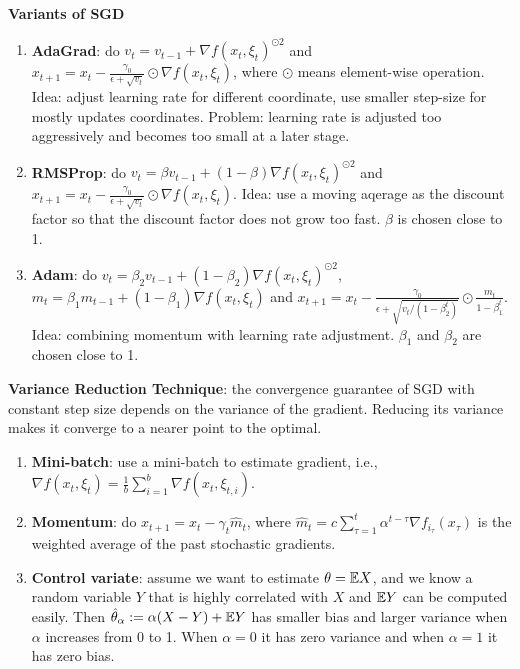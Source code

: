 \begin{enumerate}
\end{enumerate}

\textbf{Variants of SGD}
\begin{enumerate}
    \item \textbf{AdaGrad}: do $v_t = v_{t-1} + \nabla f(x_t, \xi_t)^{\odot 2}$ and $x_{t+1} = x_t - \frac{\gamma_0}{\epsilon+\sqrt{v_t}} \odot \nabla f(x_t, \xi_t)$, where $\odot$ means element-wise operation. Idea: adjust learning rate for different coordinate, use smaller step-size for mostly updates coordinates. Problem: learning rate is adjusted too aggressively and becomes too small at a later stage.
    \item \textbf{RMSProp}: do $v_t = \beta v_{t-1} + (1-\beta)\nabla f(x_t, \xi_t)^{\odot 2}$ and $x_{t+1} = x_t - \frac{\gamma_0}{\epsilon+\sqrt{v_t}} \odot \nabla f(x_t, \xi_t)$. Idea: use a moving aqerage as the discount factor so that the discount factor does not grow too fast. $\beta$ is chosen close to 1.
    \item \textbf{Adam}: do $v_t = \beta_2 v_{t-1}+(1-\beta_2)\nabla f(x_t, \xi_t)^{\odot 2}$, $m_t = \beta_1 m_{t-1} + (1-\beta_1)\nabla f(x_t, \xi_t)$ and $x_{t+1} = x_t - \frac{\gamma_0}{\epsilon + \sqrt{v_t / (1-\beta_2^t)}}\odot \frac{m_t}{1-\beta_1^t}$. Idea: combining momentum with learning rate adjustment. $\beta_1$ and $\beta_2$ are chosen close to 1.
\end{enumerate}

\textbf{Variance Reduction Technique}: the convergence guarantee of SGD with constant step size depends on the variance of the gradient. Reducing its variance makes it converge to a nearer point to the optimal.
\begin{enumerate}
    \item \textbf{Mini-batch}: use a mini-batch to estimate gradient, i.e., $\nabla f(x_t, \xi_t) = \frac{1}{b}\sum_{i=1}^b \nabla f(x_t, \xi_{t, i})$.
    \item \textbf{Momentum}: do $x_{t+1}=x_t - \gamma_t \hat{m}_t$, where $\hat{m}_t = c\sum_{\tau=1}^t \alpha^{t-\tau} \nabla f_{i_\tau}(x_\tau)$ is the weighted average of the past stochastic gradients.
    \item \textbf{Control variate}: assume we want to estimate $\theta=\mathbb{E} X$, and we know a random variable $Y$ that is highly correlated with $X$ and $\mathbb{E} Y$ can be computed easily. Then $\hat{\theta}_\alpha := \alpha(X-Y)+\mathbb{E} Y$ has smaller bias and larger variance when $\alpha$ increases from 0 to 1. When $\alpha=0$ it has zero variance and when $\alpha=1$ it has zero bias.
\end{enumerate}

